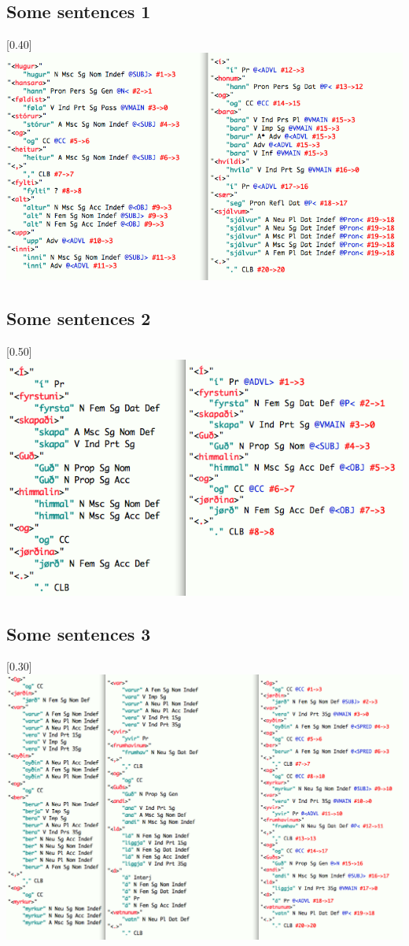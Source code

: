 \documentclass{article}
\begin{document}
\subsection{Some sentences 1} 
\scalebox{0.40}[0.40]{\includegraphics{img/hugur.png}} \\\subsection{Some sentences 2} 
\scalebox{0.50}[0.50]{\includegraphics{img/fyrstuni.png}} \\\subsection{Some sentences 3} 
\scalebox{0.30}[0.30]{\includegraphics{img/frumhavinum.png}} \\
\end{document}
